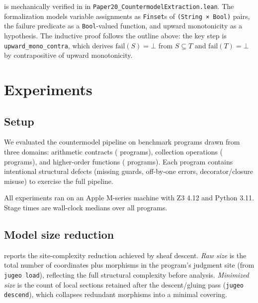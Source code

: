 \documentclass[11pt]{article}
\newcommand{\Fail}{\mathrm{fail}}          %
\begin{document}
 is mechanically verified in \LEAN{} in
\texttt{Paper20\_CountermodelExtraction.lean}.  The formalization models
variable assignments as \texttt{Finset}s of \texttt{(String × Bool)}
pairs, the failure predicate as a \texttt{Bool}-valued function, and
upward monotonicity as a hypothesis.  The inductive proof follows the
outline above: the key step is \texttt{upward\_mono\_contra}, which
derives $\Fail(S) = \bot$ from $S \subseteq T$ and $\Fail(T) = \bot$
by contrapositive of upward monotonicity.


\section{Experiments}
\label{sec:experiments}

\subsection{Setup}

We evaluated the countermodel pipeline on \ppTwentyTotalPrograms{} benchmark
programs drawn from three domains: arithmetic
contracts (\ppTwentyArithPrograms{} programs), collection operations
(\ppTwentyCollPrograms{} programs), and higher-order functions
(\ppTwentyHOPrograms{} programs).  Each program contains intentional
structural defects (missing guards, off-by-one errors, decorator/closure
misuse) to exercise the full pipeline.

All experiments ran on an Apple M-series machine with Z3 4.12 and
Python 3.11.  Stage times are wall-clock medians over all programs.

\subsection{Model size reduction}

 reports the site-complexity reduction achieved by sheaf
descent.  \emph{Raw size} is the total number of coordinates plus morphisms
in the program's judgment site (from \texttt{jugeo load}), reflecting the
full structural complexity before analysis.  \emph{Minimized size} is the
count of local sections retained after the descent/gluing pass
(\texttt{jugeo descend}), which collapses redundant morphisms into a minimal
covering.
\end{document}

